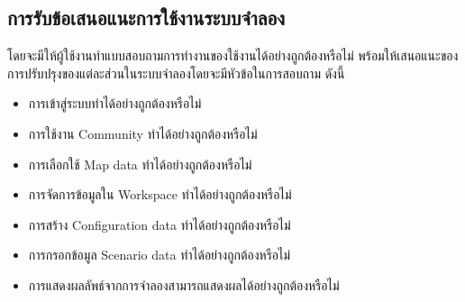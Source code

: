 \begin{mypara}
    \subsection{การรับข้อเสนอแนะการใช้งานระบบจำลอง}
        \begin{mypara}
            \indent โดยจะมีให้ผู้ใช้งานทำแบบสอบถามการทำงานของใช้งานได้อย่างถูกต้องหรือไม่
            พร้อมให้เสนอแนะของการปรับปรุงของแต่ละส่วนในระบบจำลองโดยจะมีหัวข้อในการสอบถาม ดังนี้
            \begin{itemize}
                \item การเข้าสู่ระบบทำได้อย่างถูกต้องหรือไม่
                \item การใช้งาน Community ทำได้อย่างถูกต้องหรือไม่
                \item การเลือกใช้ Map data ทำได้อย่างถูกต้องหรือไม่
                \item การจัดการข้อมูลใน Workspace ทำได้อย่างถูกต้องหรือไม่
                \item การสร้าง Configuration data ทำได้อย่างถูกต้องหรือไม่
                \item การกรอกข้อมูล Scenario data ทำได้อย่างถูกต้องหรือไม่
                \item การแสดงผลลัพธ์จากการจำลองสามารถแสดงผลได้อย่างถูกต้องหรือไม่
            \end{itemize}
        \end{mypara}

\end{mypara}

